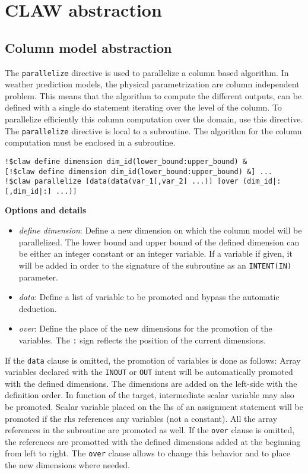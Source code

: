 \section{CLAW abstraction}


\subsection{Column model abstraction}

The \lstinline!parallelize! directive is used to parallelize a column based
algorithm. In weather prediction models, the physical parametrization are column
independent problem. This means that the algorithm to compute the different
outputs, can be defined with a single do statement iterating over the level of
the column.
To parallelize efficiently this column computation over the domain, use this
directive.
The \lstinline!parallelize! directive is local to a subroutine. The algorithm
for the column computation must be enclosed in a subroutine.

\begin{lstlisting}
!$claw define dimension dim_id(lower_bound:upper_bound) &
[!$claw define dimension dim_id(lower_bound:upper_bound) &] ...
!$claw parallelize [data(data(var_1[,var_2] ...)] [over (dim_id|:[,dim_id|:] ...)]
\end{lstlisting}

\textbf{Options and details}
\begin{itemize}
\item \textit{define dimension}: Define a new dimension on which the column
model will be parallelized. The lower bound and upper bound of the defined
dimension can be either an integer constant or an integer variable. If a
variable if given, it will be added in order to the signature of the subroutine
as an \lstinline!INTENT(IN)! parameter.
\item \textit{data}: Define a list of variable to be promoted and bypass the
automatic deduction.
\item \textit{over}: Define the place of the new dimensions for the promotion of
the variables. The \lstinline!:! sign reflects the position of the current
dimensions.
\end{itemize}

If the \lstinline!data! clause is omitted, the promotion of variables is done as
follows:
Array variables declared with the \lstinline!INOUT! or \lstinline!OUT! intent
will be automatically promoted with the defined dimensions. The dimensions are
added on the left-side with the definition order.
In function of the target, intermediate scalar variable may also be promoted.
Scalar variable placed on the lhs of an assignment statement will be promoted
if the rhs references any variables (not a constant).
All the array references in the subroutine are promoted as well. If the
\lstinline!over! clause is omitted, the references are promotted with the
defined dimensions added at the beginning from left to right. The
\lstinline!over! clause allows to change this behavior and to place the new
dimensions where needed.

